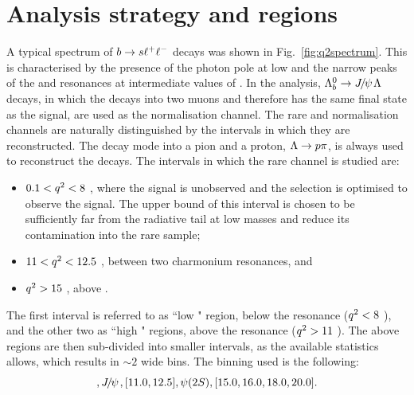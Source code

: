 \section{Analysis strategy and \qsq regions}
\label{sec:Lb_q2choice}

A typical \qsq spectrum of ${b}\rightarrow{\ensuremath{s}}\ell^+ \ell^-$ decays was shown in Fig.~\ref{fig:q2spectrum}.
This is characterised by the presence of the photon pole at low \qsq and the narrow peaks of the \jpsi and \psitwos 
resonances at intermediate values of \qsq. In the analysis, $\Lb\to\jpsi\Lz$ decays, in which the \jpsi decays into two muons
 and therefore has the same final state as the signal, are used as the normalisation channel. The rare and normalisation 
 channels are naturally distinguished by the \qsq intervals in which they are reconstructed. 
The \Lz decay mode into a pion and a proton, $\Lz\to p\pi$, is always used to reconstruct the decays. 
The intervals in which the rare channel is studied are:
\begin{itemize}
\item $0.1 < {q^2} < 8$ \gevgevcccc, where the signal is unobserved and the selection 
is optimised to observe the signal. The upper bound of this interval is chosen to be sufficiently 
far from the \jpsi radiative tail at low masses and reduce its contamination into the rare sample;
\item $11 < {q^2} < 12.5$ \gevgevcccc, between two charmonium resonances, and 
\item ${q^2}>15$ \gevgevcccc, above \psitwos.
\end{itemize}
The first interval is referred to as ``low \qsq" region, below the \jpsi resonance (${q^2} < 8$ \gevgevcccc),
and the other two as ``high \qsq" regions, above the \jpsi resonance (${q^2} > 11$ \gevgevcccc).
The above regions are then sub-divided into smaller intervals, as the available 
statistics allows, which results in $\sim 2$ \gevgevcccc wide bins. The binning used is the following:
\begin{equation}
[0.1, 2.0, 4.0, 6.0, 8.0], \jpsi, [11.0, 12.5], \psitwos, [15.0, 16.0, 18.0, 20.0].
\end{equation}

